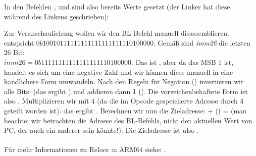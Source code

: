 In den Befehlen , \ADD und  sind also bereits Werte gesetzt (der Linker hat diese während des Linkens
geschrieben):



Zur Veranschaulichung wollen wir den BL Befehl manuell disassemblieren.\\
 entspricht $0b10010111111111111111111110100000$.
Gemäß  sind \emph{imm26} die letzten 26 Bit:\\
$imm26 = 0b11111111111111111110100000$.
Das ist , aber da das MSB 1 ist, handelt es sich um eine negative Zahl und wir können diese manuell in
eine handlichere Form umwandeln.
Nach den Regeln für Negation () invertieren wir alle Bits: (das ergibt
) und addieren dann 1 ().
Die vorzeichenbehaftete Form ist also .
Multiplizieren wir  mit 4 (da die im Opcode gespeicherte Adresse durch 4 geteilt worden ist): das ergibt
. 
Berechnen wir nun die Zieladresse:  + () =  (man beachte: wir betrachten die
Adresse des BL-Befehls, nicht den aktuellen Wert von \ac{PC}, der auch ein anderer sein könnte!).
Die Zieladresse ist also .\\\\
Für mehr Informationen zu Relocs in ARM64 siehe: \ARMELF.
